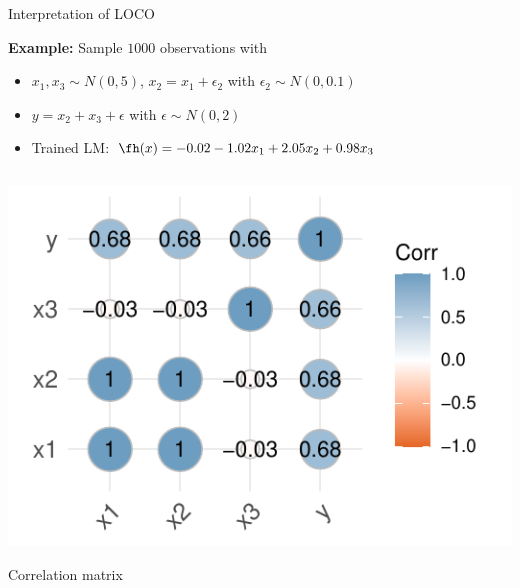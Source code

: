 \documentclass[11pt,compress,t,notes=noshow, aspectratio=169, xcolor=table]{beamer}
\begin{document}
\begin{frame}{Interpretation of LOCO}




\textbf{Example:} Sample $1000$ observations with
\begin{itemize}
    \item $x_1, x_3 \sim N(0, 5)$,  $x_2 = x_1 + \epsilon_2$ with $\epsilon_2 \sim N(0, 0.1)$
    \item $y = x_2 + x_3 + \epsilon$ with $\epsilon \sim N(0, 2)$
    \item Trained LM: $\fh(x) = -0.02 - 1.02 x_1 + 2.05 x_2 + 0.98 x_3$
\end{itemize}


\pause

\begin{columns}[c, totalwidth=\textwidth]
\begin{column}{0.42\textwidth}
\includegraphics[width=\linewidth]{figure_man/simulation_loco_corr.pdf}\\
\centerline{Correlation matrix}


\end{column}
\end{columns}
\end{frame}
\end{document}

